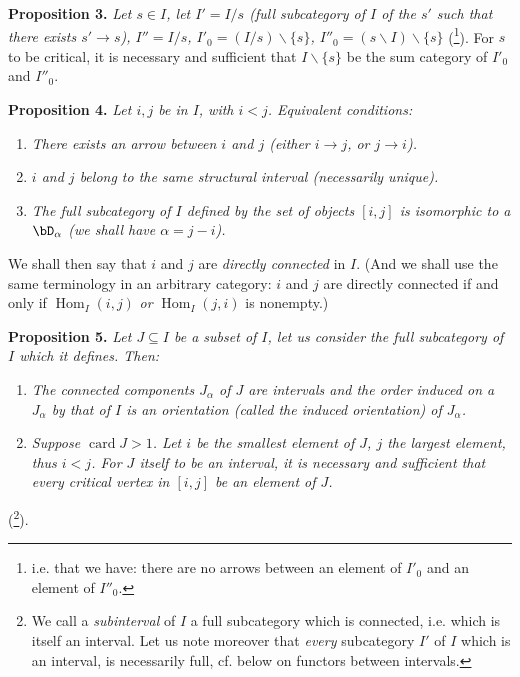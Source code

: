 \textbf{Proposition 3.} \textit{Let $s \in I$, let $I' = I/s$ (full subcategory of $I$ of the $s'$ such that there exists $s' \longrightarrow s$), $I'' = I/s$, $I'_0 = (I/s)\backslash\{s\}$, $I''_0 = (s\backslash I)\backslash\{s\}$} (\footnote[3]{i.e. that we have: there are no arrows between an element of $I'_0$ and an element of $I''_0$.}). For $s$ to be critical, it is necessary and sufficient that $I\backslash\{s\}$ be the sum category of $I'_0$ and $I''_0$.


\textbf{Proposition 4.} \textit{Let $i,j$ be in $I$, with $i < j$. Equivalent conditions:}
\begin{enumerate}
\item[\textit{a)}] \textit{There exists an arrow between $i$ and $j$ (either $i \longrightarrow j$, or $j \longrightarrow i$).}
\item[\textit{b)}] \textit{$i$ and $j$ belong to the same structural interval (necessarily unique).}
\item[\textit{c)}] \textit{The full subcategory of $I$ defined by the set of objects $[i,j]$ is isomorphic to a $\bD_\alpha$ (we shall have $\alpha = j-i$).}
\end{enumerate}

We shall then say that $i$ and $j$ are \textit{directly connected} in $I$. (And we shall use the same terminology in an arbitrary category: $i$ and $j$ are directly connected if and only if $\operatorname{Hom}_I(i,j)$ \textit{or} $\operatorname{Hom}_I(j,i)$ is nonempty.)

\textbf{Proposition 5.} \textit{Let $J \subseteq I$ be a subset of $I$, let us consider the full subcategory of $I$ which it defines. Then:}
\begin{enumerate}
\item[\textit{a)}] \textit{The connected components $J_\alpha$ of $J$ are intervals and the order induced on a $J_\alpha$ by that of $I$ is an orientation (called the \textup{induced orientation}) of $J_\alpha$.}
\item[\textit{b)}] \textit{Suppose $\operatorname{card} J > 1$. Let $i$ be the smallest element of $J$, $j$ the largest element, thus $i < j$. For $J$ itself to be an interval, it is necessary and sufficient that every critical vertex in $[i,j]$ be an element of $J$.}
\end{enumerate}

(\footnote[4]{We call a \textit{subinterval} of $I$ a full subcategory %
which is connected, i.e. which is itself an interval. Let us note moreover that \textit{every} subcategory $I'$ of $I$ which is an interval, is necessarily full, cf. below on functors between intervals.}).

